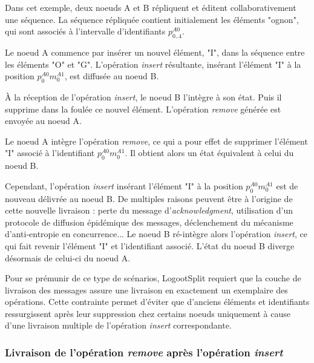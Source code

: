 \documentclass[12pt]{thesul}
\newcommand{\trm}[1]{\mathit{#1}}
\newcommand{\id}[3]{$\trm{#1}^{\trm{#2}}_{\trm{#3}}$}
\begin{document}
Dans cet exemple, deux noeuds A et B répliquent et éditent collaborativement une séquence.
La séquence répliquée contient initialement les éléments "ognon", qui sont associés à l'intervalle d'identifiants \id{p}{A0}{0..4}.

Le noeud A commence par insérer un nouvel élément, "I", dans la séquence entre les éléments "O" et "G".
L'opération \emph{insert} résultante, insérant l'élément "I" à la position \id{p}{A0}{0}\id{m}{A1}{0}, est diffusée au noeud B.

À la réception de l'opération \emph{insert}, le noeud B l'intègre à son état.
Puis il supprime dans la foulée ce nouvel élément.
L'opération \emph{remove} générée est envoyée au noeud A.

Le noeud A intègre l'opération \emph{remove}, ce qui a pour effet de supprimer l'élément "I" associé à l'identifiant \id{p}{A0}{0}\id{m}{A1}{0}.
Il obtient alors un état équivalent à celui du noeud B.

Cependant, l'opération \emph{insert} insérant l'élément "I" à la position \id{p}{A0}{0}\id{m}{A1}{0} est de nouveau délivrée au noeud B.
De multiples raisons peuvent être à l'origine de cette nouvelle livraison : perte du message d'\emph{acknowledgment}, utilisation d'un protocole de diffusion épidémique des messages, déclenchement du mécanisme d'anti-entropie en concurrence...
Le noeud B ré-intègre alors l'opération \emph{insert}, ce qui fait revenir l'élément "I" et l'identifiant associé.
L'état du noeud B diverge désormais de celui-ci du noeud A.

Pour se prémunir de ce type de scénarios, LogootSplit requiert que la couche de livraison des messages assure une livraison en exactement un exemplaire des opérations.
Cette contrainte permet d'éviter que d'anciens éléments et identifiants ressurgissent après leur suppression chez certains noeuds uniquement à cause d'une livraison multiple de l'opération \emph{insert} correspondante.


\subsubsection{Livraison de l'opération \emph{remove} après l'opération \emph{insert}}
\end{document}
